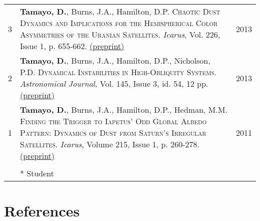 \documentclass[10pt]{article} %
\begin{document}
\begin{tabular}{>{\hfill}r|p{14.3cm}l}
3 & {\bf Tamayo, D.}, Burns, J.A., Hamilton, D.P. \textsc{Chaotic Dust Dynamics and Implications for the Hemispherical Color Asymmetries of the Uranian Satellites}. {\it Icarus}, Vol. 226, Issue 1, p. 655-662. \href{http://arxiv.org/abs/1306.3973}{(preprint)} & 2013 \\ 

2 & {\bf Tamayo, D.}, Burns, J.A., Hamilton, D.P., Nicholson, P.D. \textsc{Dynamical Instabilities in High-Obliquity Systems}. {\it Astronomical Journal}, Vol. 145, Issue 3, id. 54, 12 pp. \href{http://arxiv.org/abs/1212.0028}{(preprint)} & 2013 \\

1 & {\bf Tamayo, D.}, Burns, J.A., Hamilton, D.P., Hedman, M.M. \textsc{Finding the Trigger to Iapetus' Odd Global Albedo Pattern: Dynamics of Dust from Saturn's Irregular Satellites}. {\it Icarus}, Volume 215, Issue 1, p. 260-278. \href{http://arxiv.org/abs/1106.1893}{(preprint)} & 2011 \\

\multicolumn{3}{c}{} \\

& * Student
\end{tabular}


\section{References}
\end{document}
